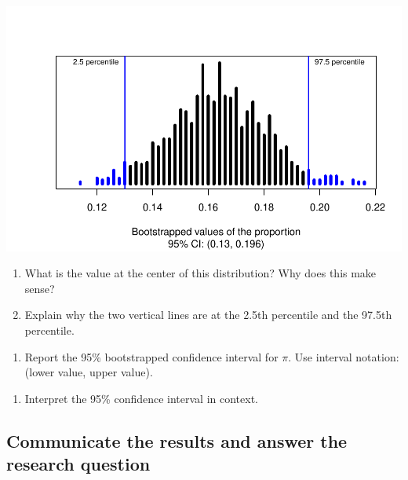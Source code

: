 \documentclass[
]{report}
\providecommand{\tightlist}{%
  \setlength{\itemsep}{0pt}\setlength{\parskip}{0pt}}
\begin{document}
\begin{center}\includegraphics[width=0.7\linewidth]{06-inference-1cat_files/figure-latex/unnamed-chunk-6-1} \end{center}

\begin{enumerate}
\def\labelenumi{\arabic{enumi}.}
\setcounter{enumi}{24}
\item
  What is the value at the center of this distribution? Why does this make sense?
  \vspace{.8in}
\item
  Explain why the two vertical lines are at the 2.5th percentile and the 97.5th percentile.
\end{enumerate}

\vspace{.8in}

\begin{enumerate}
\def\labelenumi{\arabic{enumi}.}
\setcounter{enumi}{26}
\tightlist
\item
  Report the 95\% bootstrapped confidence interval for \(\pi\). Use interval notation: (lower value, upper value).
\end{enumerate}

\vspace{1in}

\begin{enumerate}
\def\labelenumi{\arabic{enumi}.}
\setcounter{enumi}{27}
\tightlist
\item
  Interpret the 95\% confidence interval in context.
\end{enumerate}

\vspace{.8in}

\hypertarget{communicate-the-results-and-answer-the-research-question}{%
\subsection*{Communicate the results and answer the research question}\label{communicate-the-results-and-answer-the-research-question}}
\end{document}
